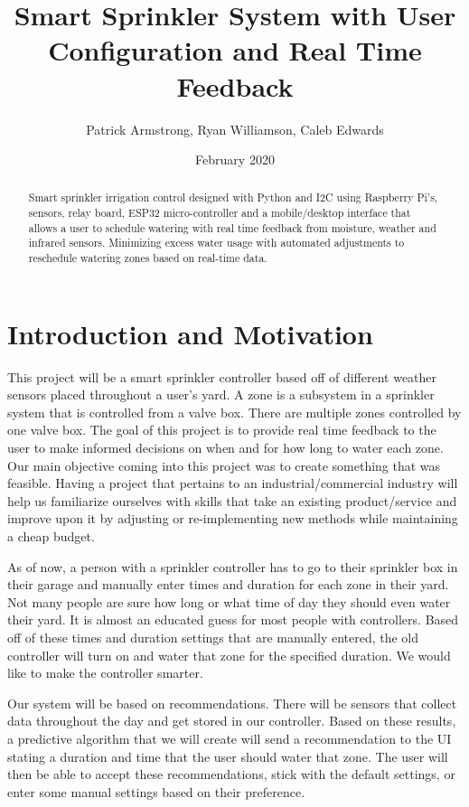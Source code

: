 \documentclass[letterpaper, 10 pt, conference]{ieeeconf}  %
\title{Smart Sprinkler System with User Configuration and Real Time Feedback}
\author{Patrick Armstrong, Ryan Williamson, Caleb Edwards}
\date{February 2020}
\begin{document}
\maketitle

\begin{abstract}
Smart sprinkler irrigation control designed with Python and I2C using Raspberry Pi's, sensors, relay board, ESP32 micro-controller and a mobile/desktop interface that allows a user to schedule watering with real time feedback from moisture, weather and infrared sensors. Minimizing excess water usage with automated adjustments to reschedule watering zones based on real-time data.

\end{abstract}

\section{Introduction and Motivation}
This project will be a smart sprinkler controller based off of different weather sensors placed throughout a user's yard. A zone is a subsystem in a sprinkler system that is controlled from a valve box. There are multiple zones controlled by one valve box. The goal of this project is to provide real time feedback to the user to make informed decisions on when and for how long to water each zone. Our main objective coming into this project was to create something that was feasible. Having a project that pertains to an industrial/commercial industry will help us familiarize ourselves with skills that take an existing product/service and improve upon it by adjusting or re-implementing new methods while maintaining a cheap budget.

As of now, a person with a sprinkler controller has to go to their sprinkler box in their garage and manually enter times and duration for each zone in their yard. Not many people are sure how long or what time of day they should even water their yard. It is almost an educated guess for most people with controllers. Based off of these times and duration settings that are manually entered, the old controller will turn on and water that zone for the specified duration. We would like to make the controller smarter. 

Our system will be based on recommendations. There will be sensors that collect data throughout the day and get stored in our controller. Based on these results, a predictive algorithm that we will create will send a recommendation to the UI stating a duration and time that the user should water that zone. The user will then be able to accept these recommendations, stick with the default settings, or enter some manual settings based on their preference. 
\end{document}
